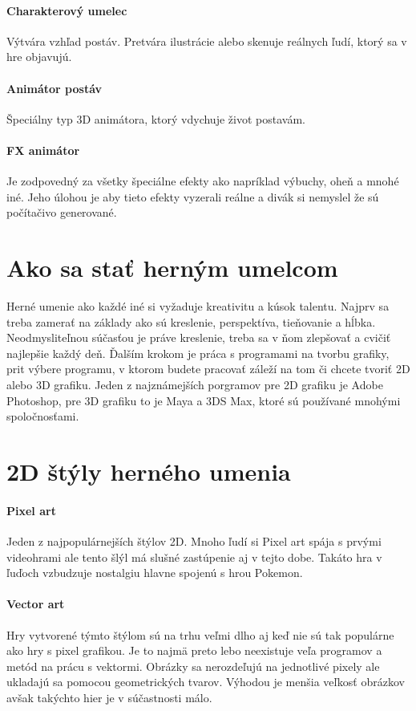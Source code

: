 \documentclass[10pt,twoside,slovak,a4paper]{article}
\begin{document}
\paragraph{Charakterový umelec} Výtvára vzhľad postáv. Pretvára ilustrácie alebo skenuje reálnych ľudí, ktorý sa v hre objavujú.
\cite{spectrum1}

\paragraph{Animátor postáv} Špeciálny typ 3D animátora, ktorý vdychuje život postavám. 
\cite{spectrum2}

\paragraph{FX animátor}Je zodpovedný za všetky špeciálne efekty ako napríklad výbuchy, oheň a mnohé iné. Jeho úlohou je aby tieto efekty vyzerali reálne a divák si nemyslel že sú počítačivo generované.
\cite{spectrum3}

\section{Ako sa stať herným umelcom}
Herné umenie ako každé iné si vyžaduje kreativitu a kúsok talentu. Najprv sa treba zamerať na základy ako sú kreslenie, perspektíva, tieňovanie a hĺbka. Neodmysliteľnou súčasťou je práve kreslenie, treba sa v ňom zlepšovať a cvičiť najlepšie každý deň. Ďalším krokom je práca s programami na tvorbu grafiky, prit výbere programu, v ktorom budete pracovať záleží na tom či chcete tvoriť 2D alebo 3D grafiku. Jeden z najznámejších porgramov pre 2D grafiku je Adobe Photoshop, pre 3D grafiku to je Maya a 3DS Max, ktoré sú používané mnohými spoločnosťami.
\cite{1}






\section{2D štýly herného umenia}
\cite{2D}
\paragraph{Pixel art}
Jeden z najpopulárnejších štýlov 2D. Mnoho ľudí si Pixel art spája s prvými videohrami ale tento šlýl má slušné zastúpenie aj v tejto dobe. Takáto hra v ľuďoch vzbudzuje nostalgiu hlavne spojenú s hrou Pokemon.


\paragraph{Vector art}
Hry vytvorené týmto štýlom sú na trhu veľmi dlho aj keď nie sú tak populárne ako hry s pixel grafikou. Je to najmä preto lebo neexistuje veľa programov a metód na prácu s vektormi. Obrázky sa nerozdeľujú na jednotlivé pixely ale ukladajú sa pomocou geometrických tvarov. Výhodou je menšia veľkosť obrázkov avšak takýchto hier je v súčastnosti málo.
\end{document}

